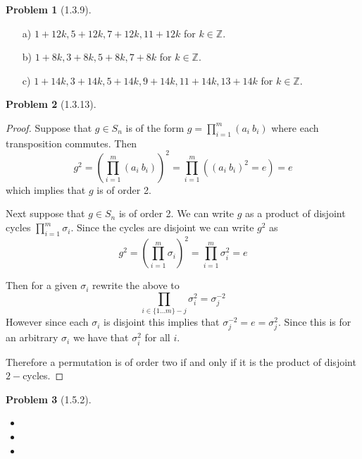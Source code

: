 \documentclass[10pt]{article}
\newcommand{\sk}{\vskip 10mm}
\newcommand{\bb}[1]{\mathbb{#1}}
\theoremstyle{plain}
\newtheorem{problem}{Problem}
\theoremstyle{remark}
\begin{document}
\sk

\begin{problem}[1.3.9] 
  
\end{problem}

\begin{itemize}
\item[a)] $1+12k,5+12k,7+12k,11+12k$ for $k\in\bb{Z}$.
\item[b)] $1+8k,3+8k,5+8k,7+8k$ for $k\in\bb{Z}$.
\item[c)] $1+14k,3+14k,5+14k,9+14k,11+14k,13+14k$ for $k\in\bb{Z}$.
\end{itemize}

\sk

\begin{problem}[1.3.13] 
  
\end{problem}

\begin{proof}
  Suppose that $g\in S_n$ is of the form $g=\prod_{i=1}^m(a_i\ b_i)$
  where each transposition commutes. Then
  \[ g^2 = \left(\prod_{i=1}^m(a_i\ b_i)\right)^2=
    \prod_{i=1}^m((a_i\ b_i)^2=e)=e \]
  which implies that $g$ is of order 2.

  Next suppose that $g\in S_n$ is of order 2. We can write $g$
  as a product of disjoint cycles $\prod_{i=1}^m\sigma_i$. Since
  the cycles are disjoint we can write $g^2$ as
  \[ g^2=\left(\prod_{i=1}^m\sigma_i\right)^2=\prod_{i=1}^m\sigma_i^2=e \]

  Then for a given $\sigma_i$ rewrite the above to
  \[ \prod_{i\in\{1\ldots m\}-j}\sigma_i^2 = \sigma_j^{-2} \]
  However since each $\sigma_i$ is disjoint this implies that
  $\sigma_j^{-2}=e=\sigma_j^2$. Since this is for an arbitrary
  $\sigma_i$ we have that $\sigma_i^2$ for all $i$.

  Therefore a permutation is of order two if and only if
  it is the product of disjoint $2-$cycles.
\end{proof}

\sk

\begin{problem}[1.5.2] 
  
\end{problem}

\begin{itemize}
\item
\item
\item
\end{itemize}
\sk

\end{document}
